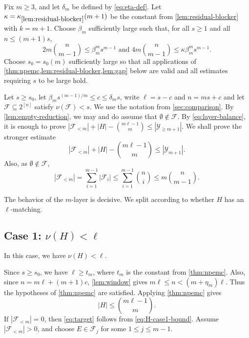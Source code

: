 \documentclass[10pt,a4paper]{article}
\numberwithin{equation}{section}
\theoremstyle{definition}
\newcommand{\F}{\mathcal F}
\newcommand{\Y}{\mathcal Y}
\begin{document}
Fix $m\ge3$, and let $\delta_m$ be defined by \eqref{eq:eta-def}.
Let $\kappa=\kappa_{\ref{lem:residual-blocker}}(m+1)$ be the constant from \cref{lem:residual-blocker} with $k=m+1$.
Choose $\beta_m$ sufficiently large such that, for all $s\ge1$ and all $n\le(m+1)s$,
\begin{equation}\label{eq:K-choice}
        2m\binom n{m-1}\le \beta_m^m s^{m-1}
        \text{ and }
        4m\binom n{m-1}\le \kappa \beta_m^m s^{m-1}.
\end{equation}
Choose $s_0=s_0(m)$ sufficiently large so that all applications of \cref{thm:npemc,lem:residual-blocker,lem:gap} below are valid and all estimates requiring $s$ to be large hold.


Let $s\ge s_0$, let $\beta_m s^{(m-1)/m}\le c\le\delta_m s$, write $\ell=s-c$ and $n=ms+c$ and let $\F\subseteq2^{[n]}$ satisfy $\nu(\F)<s$.
We use the notation from \cref{sec:comparison}.
By \cref{lem:empty-reduction}, we may and do assume that $\emptyset\notin\F$.
By \eqref{eq:layer-balance}, it is enough to prove $|\F_{<m}|+|H|-\binom{m\ell-1}{m}
        \le
        |\Y_{\ge m+1}|$.
We shall prove the stronger estimate
\begin{equation}\label{eq:target}
        |\F_{<m}|+|H|-\binom{m\ell-1}{m}
        \le
        |\Y_{m+1}|.
\end{equation}
Also, as $\emptyset\notin\F$,
\begin{equation}\label{eq:low-layer-bound}
        |\F_{<m}|
        =
        \sum_{i=1}^{m-1}|\F_i|
        \le
        \sum_{i=1}^{m-1}\binom ni
        \le
        m\binom n{m-1}.
\end{equation}

The behavior of the $m$-layer is decisive.
We split according to whether $H$ has an $\ell$-matching.

\subsection{Case 1: $\nu(H)<\ell$}

In this case, we have $\nu(H)<\ell$.

Since \(s\ge s_0\), we have \(\ell\ge t_m\), where $t_m$ is the constant from \cref{thm:npemc}.
Also, since $n=m\ell+(m+1)c$, \cref{lem:window} gives $m\ell\le n<(m+\eta_m)\ell$.
Thus the hypotheses of \cref{thm:npemc} are satisfied.
Applying \cref{thm:npemc} gives
\begin{equation}\label{eq:H-case1-bound}
        |H|\le\binom{m\ell-1}{m}.
\end{equation}
If $|\F_{<m}|=0$, then \eqref{eq:target} follows from \eqref{eq:H-case1-bound}.
Assume $|\F_{<m}|>0$, and choose $E\in\F_j$ for some $1\le j\le m-1$.
\end{document}
